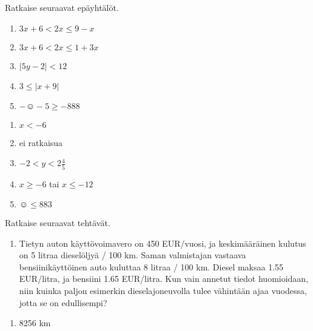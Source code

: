 \begin{tehtava}
    Ratkaise seuraavat epäyhtälöt.
    \begin{enumerate}
        \item $3x+6<2x\leq 9-x$
        \item $3x+6<2x\leq 1+3x$
        \item $|5y-2|<12$
        \item $3\leq |x+9|$
        \item $-\smiley{}-5\geq-888$
    \end{enumerate}
    \begin{vastaus}
        \begin{enumerate}
            \item $x<-6$
            \item ei ratkaisua
            \item $-2<y<2\frac{4}{5}$
            \item $x\geq -6$ tai $x\leq -12$
            \item $\smiley{}\leq 883$
        \end{enumerate}
    \end{vastaus}
\end{tehtava}


\begin{tehtava}
    Ratkaise seuraavat tehtävät.
    \begin{enumerate}
        \item Tietyn auton käyttövoimavero on 450 EUR/vuosi, ja keskimääräinen kulutus on 5 litraa dieselöljyä / 100 km. Saman valmistajan vastaava bensiinikäyttöinen auto kuluttaa 8 litraa / 100 km. Diesel maksaa 1.55 EUR/litra, ja bensiini 1.65 EUR/litra. Kun vain annetut tiedot huomioidaan, niin kuinka paljon esimerkin dieselajoneuvolla tulee vähintään ajaa vuodessa, jotta se on edullisempi?
    \end{enumerate}
    \begin{vastaus}
        \begin{enumerate}
            \item 8256 km
        \end{enumerate}
    \end{vastaus}
\end{tehtava}